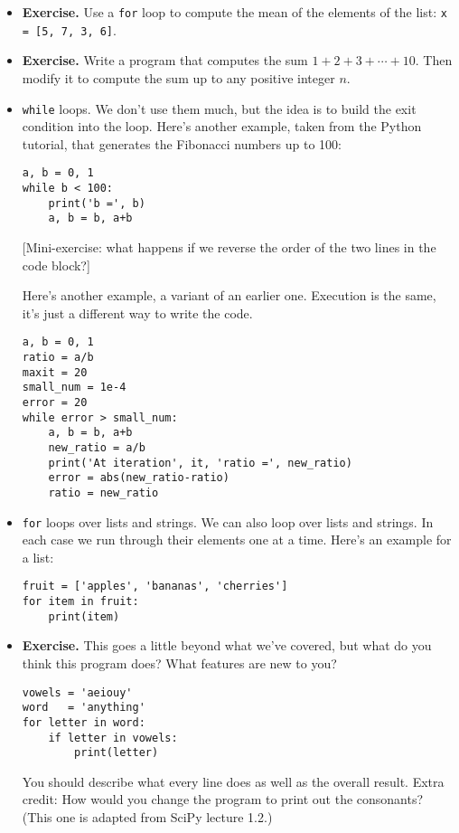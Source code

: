 \documentclass[11pt]{article}
\begin{document}
\begin{itemize}
\item {\bf Exercise.}
Use a {\tt for} loop to compute the mean of the elements of the list:  {\tt x = [5, 7, 3, 6]}.

\item {\bf Exercise.}
Write a program that computes the sum
$ 1 + 2 + 3 + \cdots + 10 $.
Then modify it to compute the sum up to any positive integer $n$.

\item {\tt while} loops.
We don't use them much,
but the idea is to build the exit condition into the loop.
Here's another example, taken from the Python tutorial,
 that generates the Fibonacci numbers up to 100:
\begin{verbatim}
a, b = 0, 1
while b < 100:
    print('b =', b)
    a, b = b, a+b
\end{verbatim}
[Mini-exercise:  what happens if we reverse the order of the two lines in
the code block?]

Here's another example, a variant of an earlier one.
Execution is the same, it's just a different way to
write the code.
\begin{verbatim}
a, b = 0, 1
ratio = a/b
maxit = 20
small_num = 1e-4
error = 20
while error > small_num:
    a, b = b, a+b
    new_ratio = a/b
    print('At iteration', it, 'ratio =', new_ratio)
    error = abs(new_ratio-ratio)
    ratio = new_ratio
\end{verbatim}




\item {\tt for} loops over lists and strings.
We can also loop over lists and strings.
In each case we run through their elements one at a time.
Here's an example for a list:
\begin{verbatim}
fruit = ['apples', 'bananas', 'cherries']
for item in fruit:
    print(item)
\end{verbatim}

\item {\bf Exercise.}
This goes a little beyond what we've covered, but what do you think this program does?
What features are new to you?
\begin{verbatim}
vowels = 'aeiouy'
word   = 'anything'
for letter in word:
    if letter in vowels:
        print(letter)
\end{verbatim}
You should describe what every line does as well as the overall
result.
Extra credit:  How would you change the program to print
out the consonants?
(This one is adapted from SciPy lecture 1.2.)


\end{itemize}
\end{document}
